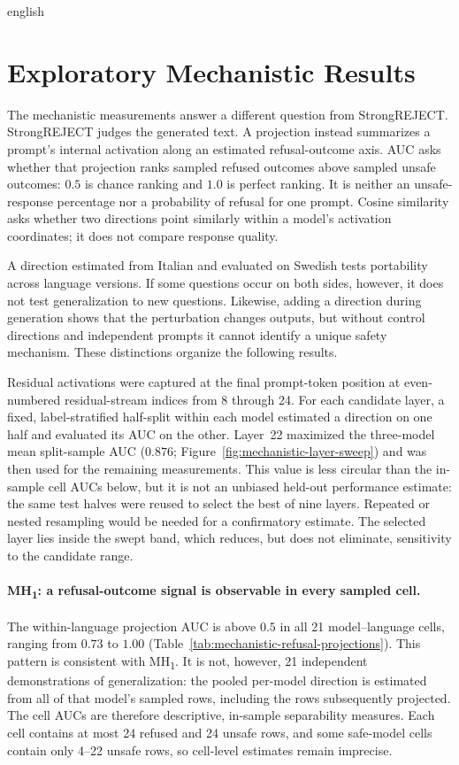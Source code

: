 \begin{otherlanguage*}{english}
\section{Exploratory Mechanistic Results}
\label{sec:mechanistic-results}
\setcounter{secnumdepth}{3}

The mechanistic measurements answer a different question from StrongREJECT. StrongREJECT judges the generated text. A projection instead summarizes a prompt's internal activation along an estimated refusal-outcome axis. AUC asks whether that projection ranks sampled refused outcomes above sampled unsafe outcomes: $0.5$ is chance ranking and $1.0$ is perfect ranking. It is neither an unsafe-response percentage nor a probability of refusal for one prompt. Cosine similarity asks whether two directions point similarly within a model's activation coordinates; it does not compare response quality.

A direction estimated from Italian and evaluated on Swedish tests portability across language versions. If some questions occur on both sides, however, it does not test generalization to new questions. Likewise, adding a direction during generation shows that the perturbation changes outputs, but without control directions and independent prompts it cannot identify a unique safety mechanism. These distinctions organize the following results.

Residual activations were captured at the final prompt-token position at even-numbered residual-stream indices from 8 through 24. For each candidate layer, a fixed, label-stratified half-split within each model estimated a direction on one half and evaluated its AUC on the other. Layer~22 maximized the three-model mean split-sample AUC ($0.876$; Figure~\ref{fig:mechanistic-layer-sweep}) and was then used for the remaining measurements. This value is less circular than the in-sample cell AUCs below, but it is not an unbiased held-out performance estimate: the same test halves were reused to select the best of nine layers. Repeated or nested resampling would be needed for a confirmatory estimate. The selected layer lies inside the swept band, which reduces, but does not eliminate, sensitivity to the candidate range.

\MechLayerSweepFigure

\paragraph*{MH\textsubscript{1}: a refusal-outcome signal is observable in every sampled cell.} The within-language projection AUC is above $0.5$ in all 21 model--language cells, ranging from $0.73$ to $1.00$ (Table~\ref{tab:mechanistic-refusal-projections}). This pattern is consistent with MH\textsubscript{1}. It is not, however, 21 independent demonstrations of generalization: the pooled per-model direction is estimated from all of that model's sampled rows, including the rows subsequently projected. The cell AUCs are therefore descriptive, in-sample separability measures. Each cell contains at most 24 refused and 24 unsafe rows, and some safe-model cells contain only 4--22 unsafe rows, so cell-level estimates remain imprecise.


\end{otherlanguage*}
